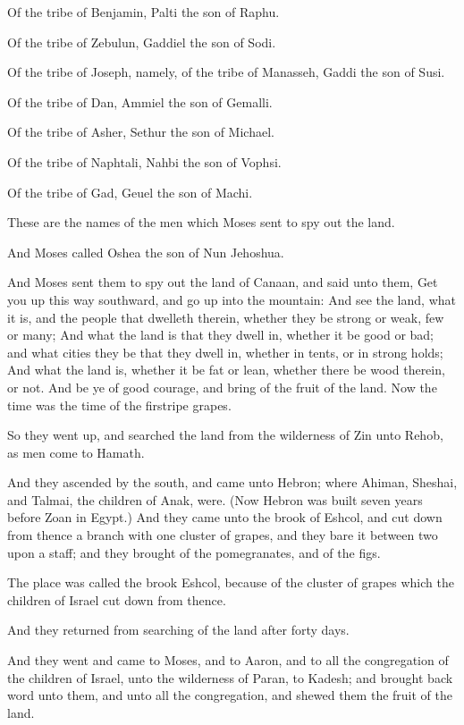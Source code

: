 \Verse Of the tribe of Benjamin, Palti the son of Raphu.

\Verse Of the tribe of Zebulun, Gaddiel the son of Sodi.

\Verse Of the tribe of Joseph, namely, of the tribe of Manasseh, Gaddi
the son of Susi.

\Verse Of the tribe of Dan, Ammiel the son of Gemalli.

\Verse Of the tribe of Asher, Sethur the son of Michael.

\Verse Of the tribe of Naphtali, Nahbi the son of Vophsi.

\Verse Of the tribe of Gad, Geuel the son of Machi.

\Verse These are the names of the men which Moses sent to spy out the
land.

And Moses called Oshea the son of Nun Jehoshua.

\Verse And Moses sent them to spy out the land of Canaan, and said unto
them, Get you up this way southward, and go up into the mountain:
\Verse And see the land, what it is, and the people that dwelleth
therein, whether they be strong or weak, few or many; \Verse And what
the land is that they dwell in, whether it be good or bad; and what
cities they be that they dwell in, whether in tents, or in strong
holds; \Verse And what the land is, whether it be fat or lean, whether
there be wood therein, or not. And be ye of good courage, and bring of
the fruit of the land. Now the time was the time of the firstripe
grapes.

\Verse So they went up, and searched the land from the wilderness of
Zin unto Rehob, as men come to Hamath.

\Verse And they ascended by the south, and came unto Hebron; where
Ahiman, Sheshai, and Talmai, the children of Anak, were. (Now Hebron
was built seven years before Zoan in Egypt.)  \Verse And they came unto
the brook of Eshcol, and cut down from thence a branch with one
cluster of grapes, and they bare it between two upon a staff; and they
brought of the pomegranates, and of the figs.

\Verse The place was called the brook Eshcol, because of the cluster of
grapes which the children of Israel cut down from thence.

\Verse And they returned from searching of the land after forty days.

\Verse And they went and came to Moses, and to Aaron, and to all the
congregation of the children of Israel, unto the wilderness of Paran,
to Kadesh; and brought back word unto them, and unto all the
congregation, and shewed them the fruit of the land.

